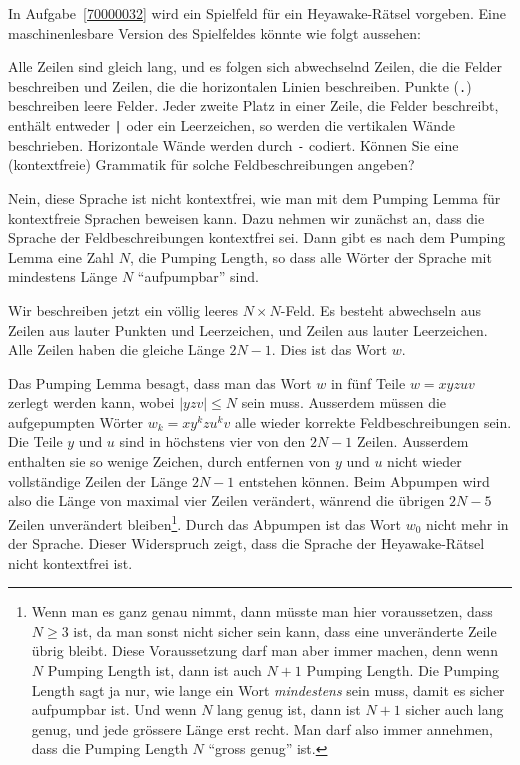 In Aufgabe~\ref{70000032} wird ein Spielfeld für ein Heyawake-Rätsel vorgeben.
Eine maschinenlesbare Version des Spielfeldes könnte wie 
folgt aussehen:
\begin{center}
\small
{}
\end{center}
Alle Zeilen sind gleich lang, und es folgen sich abwechselnd Zeilen,
die die Felder beschreiben und Zeilen, die die horizontalen Linien
beschreiben.
Punkte (\texttt{.}) beschreiben leere Felder.
Jeder zweite Platz in einer Zeile, die Felder beschreibt,
enthält entweder \texttt{|} oder ein Leerzeichen, so werden die
vertikalen Wände beschrieben.
Horizontale Wände werden durch \texttt{-} codiert.
Können Sie eine (kontextfreie) Grammatik für solche Feldbeschreibungen
angeben?


\begin{loesung}
Nein, diese Sprache ist nicht kontextfrei, wie man mit dem 
Pumping Lemma für kontextfreie Sprachen beweisen kann.
Dazu nehmen wir zunächst an, dass die Sprache der Feldbeschreibungen
kontextfrei sei. Dann gibt es nach dem Pumping Lemma eine Zahl $N$,
die Pumping Length, so dass alle Wörter der Sprache mit mindestens
Länge $N$ ``aufpumpbar'' sind.

Wir beschreiben jetzt ein völlig leeres $N\times N$-Feld. Es besteht
abwechseln aus Zeilen aus lauter Punkten und Leerzeichen, und Zeilen
aus lauter Leerzeichen. Alle Zeilen haben die gleiche Länge $2N-1$.
Dies ist das Wort $w$.

Das Pumping Lemma besagt, dass man das Wort  $w$ in fünf Teile
$w=xyzuv$ zerlegt werden kann, wobei $|yzv|\le N$ sein muss.
Ausserdem müssen die aufgepumpten Wörter $w_k=xy^kzu^kv$ alle wieder
korrekte Feldbeschreibungen sein.
Die Teile $y$ und $u$ sind in höchstens vier von den $2N-1$ Zeilen.
Ausserdem enthalten sie so wenige Zeichen, durch entfernen von
$y$ und $u$ nicht wieder vollständige Zeilen der Länge $2N-1$ entstehen
können.
Beim Abpumpen wird also die Länge von maximal vier Zeilen verändert,
wänrend die übrigen $2N-5$ Zeilen unverändert bleiben\footnote{Wenn man
es ganz genau nimmt, dann müsste man hier voraussetzen, dass $N \ge 3$ ist,
da man sonst nicht sicher sein kann, dass eine unveränderte Zeile
übrig bleibt. Diese Voraussetzung darf man aber immer machen, denn
wenn $N$ Pumping Length ist, dann ist auch $N+1$ Pumping Length.
Die Pumping Length sagt ja nur, wie lange ein Wort {\em mindestens} sein
muss, damit es sicher aufpumpbar ist. Und wenn $N$ lang genug ist, dann ist
$N+1$ sicher auch lang genug, und jede grössere Länge erst recht.
Man darf also immer annehmen, dass die Pumping Length $N$ ``gross genug'' ist.}.
Durch das Abpumpen ist das Wort $w_0$ nicht mehr in der Sprache.
Dieser Widerspruch zeigt, dass die Sprache der Heyawake-Rätsel nicht
kontextfrei ist.
\end{loesung}

